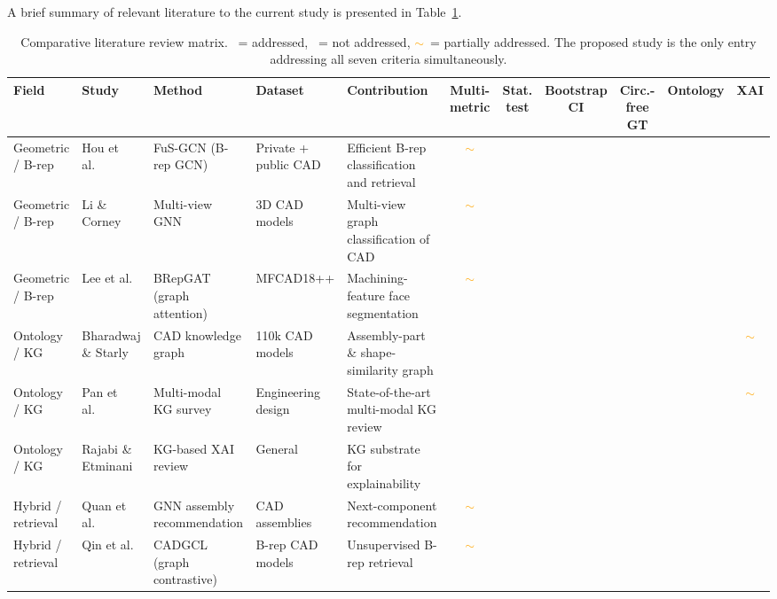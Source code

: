 \documentclass[preprint,12pt]{elsarticle}
\newcommand{\cmark}{\ding{51}}
\newcommand{\xmark}{\ding{55}}
\newcommand{\pmark}{\textcolor{orange}{$\sim$}}
\begin{document}
A brief summary of relevant literature to the current study is presented in Table~\ref{tab:LiteratureSummary}.

\begin{table}[!ht]
\centering
\caption{Comparative literature review matrix. \cmark~= addressed, \xmark~= not addressed, \pmark~= partially addressed. The proposed study is the only entry addressing all seven criteria simultaneously.}
\label{tab:LiteratureSummary}
\scriptsize
\begin{adjustbox}{width=\textwidth}
\begin{tabular}{p{2.2cm} p{2.0cm} p{3.2cm} p{2.2cm} p{3.5cm} c c c c c c}
\toprule
\textbf{Field} & \textbf{Study} & \textbf{Method} & \textbf{Dataset} & \textbf{Contribution} & \textbf{Multi-metric} & \textbf{Stat. test} & \textbf{Bootstrap CI} & \textbf{Circ.-free GT} & \textbf{Ontology} & \textbf{XAI} \\
\midrule
Geometric / B-rep & Hou et al.~\cite{Hou2023} & FuS-GCN (B-rep GCN) & Private + public CAD & Efficient B-rep classification and retrieval & \pmark & \xmark & \xmark & \xmark & \xmark & \xmark \\
Geometric / B-rep & Li \& Corney~\cite{LiCorney2023} & Multi-view GNN & 3D CAD models & Multi-view graph classification of CAD & \pmark & \xmark & \xmark & \xmark & \xmark & \xmark \\
Geometric / B-rep & Lee et al.~\cite{Lee2023} & BRepGAT (graph attention) & MFCAD18++ & Machining-feature face segmentation & \pmark & \xmark & \xmark & \xmark & \xmark & \xmark \\
Ontology / KG & Bharadwaj \& Starly~\cite{Bharadwaj2022} & CAD knowledge graph & 110k CAD models & Assembly-part \& shape-similarity graph & \xmark & \xmark & \xmark & \xmark & \cmark & \pmark \\
Ontology / KG & Pan et al.~\cite{Pan2024} & Multi-modal KG survey & Engineering design & State-of-the-art multi-modal KG review & \xmark & \xmark & \xmark & \xmark & \cmark & \pmark \\
Ontology / KG & Rajabi \& Etminani~\cite{Rajabi2024} & KG-based XAI review & General & KG substrate for explainability & \xmark & \xmark & \xmark & \xmark & \cmark & \cmark \\
Hybrid / retrieval & Quan et al.~\cite{Quan2024} & GNN assembly recommendation & CAD assemblies & Next-component recommendation & \pmark & \xmark & \xmark & \xmark & \xmark & \xmark \\
Hybrid / retrieval & Qin et al.~\cite{Qin2025} & CADGCL (graph contrastive) & B-rep CAD models & Unsupervised B-rep retrieval & \pmark & \xmark & \xmark & \xmark & \xmark & \xmark \\

\end{tabular}
\end{adjustbox}
\end{table}
\end{document}
